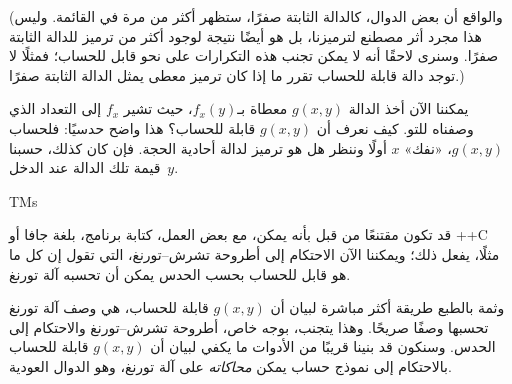 \documentclass[../../../include/open-logic-section]{subfiles}
\begin{document}
(والواقع أن بعض الدوال، كالدالة الثابتة صفرًا، ستظهر أكثر من مرة في
القائمة. وليس هذا مجرد أثر مصطنع لترميزنا، بل هو أيضًا نتيجة لوجود
أكثر من ترميز للدالة الثابتة صفرًا. وسنرى لاحقًا أنه لا يمكن تجنب هذه
التكرارات على نحو قابل للحساب؛ فمثلًا لا توجد دالة قابلة للحساب تقرر
ما إذا كان ترميز معطى يمثل الدالة الثابتة صفرًا.)

يمكننا الآن أخذ الدالة $g(x,y)$ معطاة بـ$f_x(y)$، حيث تشير $f_x$ إلى
التعداد الذي وصفناه للتو. كيف نعرف أن $g(x,y)$ قابلة للحساب؟ هذا واضح
حدسيًا: فلحساب $g(x,y)$، «نفك» $x$ أولًا وننظر هل هو ترميز لدالة
أحادية الحجة. فإن كان كذلك، حسبنا قيمة تلك الدالة عند الدخل~$y$.

\begin{tagblock}{TMs}
\begin{digress}
قد تكون مقتنعًا من قبل بأنه يمكن، مع بعض العمل، كتابة برنامج، بلغة
جافا أو ++C مثلًا، يفعل ذلك؛ ويمكننا الآن الاحتكام إلى أطروحة
تشرش--تورنغ، التي تقول إن كل ما هو قابل للحساب بحسب الحدس يمكن أن
تحسبه آلة تورنغ.

وثمة بالطبع طريقة أكثر مباشرة لبيان أن $g(x,y)$ قابلة للحساب، هي وصف آلة
تورنغ تحسبها وصفًا صريحًا. وهذا يتجنب، بوجه خاص، أطروحة تشرش--تورنغ
والاحتكام إلى الحدس. وسنكون قد بنينا قريبًا من الأدوات ما يكفي لبيان
أن $g(x,y)$ قابلة للحساب بالاحتكام إلى نموذج حساب يمكن
\emph{محاكاته} على آلة تورنغ، وهو الدوال العودية.
\end{digress}
\end{tagblock}
\end{document}
